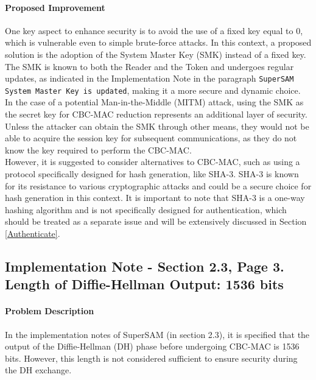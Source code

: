\documentclass[12pt]{article}
\begin{document}
    \paragraph{Proposed Improvement} 
    One key aspect to enhance security is to avoid the use of a fixed key equal to 0, which is vulnerable even to simple brute-force attacks. In this context, a proposed solution is the adoption of the System Master Key (SMK) instead of a fixed key. The SMK is known to both the Reader and the Token and undergoes regular updates, as indicated in the Implementation Note in the paragraph \texttt{SuperSAM System Master Key is updated}, making it a more secure and dynamic choice.
    \\
    In the case of a potential Man-in-the-Middle (MITM) attack, using the SMK as the secret key for CBC-MAC reduction represents an additional layer of security. Unless the attacker can obtain the SMK through other means, they would not be able to acquire the session key for subsequent communications, as they do not know the key required to perform the CBC-MAC.
    \\
    However, it is suggested to consider alternatives to CBC-MAC, such as using a protocol specifically designed for hash generation, like SHA-3. SHA-3 is known for its resistance to various cryptographic attacks and could be a secure choice for hash generation in this context. It is important to note that SHA-3 is a one-way hashing algorithm and is not specifically designed for authentication, which should be treated as a separate issue and will be extensively discussed in Section \ref*{Authenticate}.

\subsection{Implementation Note - Section 2.3, Page 3. Length of Diffie-Hellman Output: 1536 bits}
    \paragraph{Problem Description}

    In the implementation notes of SuperSAM (in section 2.3), it is specified that the output of the Diffie-Hellman (DH) phase before undergoing CBC-MAC is 1536 bits. However, this length is not considered sufficient to ensure security during the DH exchange.
\end{document}
